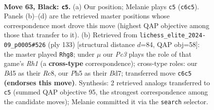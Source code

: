 \documentclass[11pt]{article}
\begin{document}
\begin{figure}[p]\centering
\begin{subfigure}{0.46\textwidth}\centering
\resizebox{\linewidth}{!}{%
\newchessgame
\chessboard[
  setfen={4rb2/5kp1/p1p4r/Pp1b1p1p/2p2P1P/2B1P1P1/1P2K2N/1R4R1 b - - 28 63},
  showmover=false,
  pgfstyle=straightmove, color=movearrow, markmove={c6-c5}
]}
\caption{}
\end{subfigure}\hfill
\begin{subfigure}{0.46\textwidth}\centering
\resizebox{\linewidth}{!}{%
\newchessgame
\chessboard[
  setfen={2r4r/2kb1p2/4p1p1/1p1pP2p/pP3P2/P1P3P1/2R1BK1P/3R4 b - - 74 67},
  showmover=false,
  pgfstyle=straightmove, color=movearrow, markmove={h8-g8}
]}
\caption{}
\end{subfigure}
\\[4pt]

\caption{\textbf{Move 63, Black: \texttt{c5}.} (a) Our position; Melanie plays \texttt{c5} (\texttt{c6c5}). Panels (b)--(d) are the retrieved master positions whose correspondence most drove this move (highest QAP objective among those that transfer to it). (b) Retrieved from \texttt{lichess\_elite\_2024-09\_p0005\#526} (ply 133) [structural distance $d$=84, QAP obj=58]: the master played \texttt{Rhg8}; under $\mu$ our \emph{Pc3} plays the role of that game's \emph{Rh1} (a \textbf{cross-type} correspondence); cross-type roles: our \emph{B}d5 as their \emph{R}c8, our \emph{P}h5 as their \emph{B}d7; transferred move \texttt{c6c5} \textbf{(endorses this move)}. Synthesis: 2 retrieved analogs transferred to \texttt{c5} (summed QAP objective 95, the strongest correspondence among the candidate moves); Melanie committed it via the \texttt{search} selector.}
\label{fig:thought-m125}
\end{figure}

\clearpage
\end{document}
